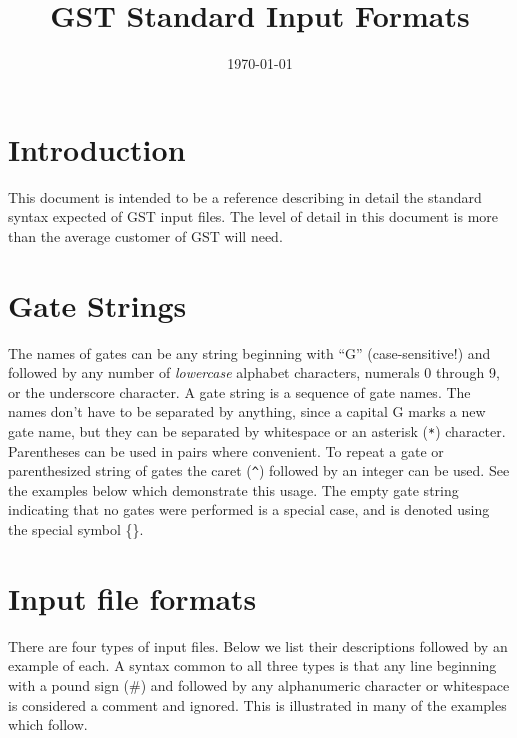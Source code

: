 \documentclass{article}[11pt]
\title{GST Standard Input Formats}
\date{\today}
\begin{document}
\maketitle


\section{Introduction}
This document is intended to be a reference describing in detail the standard syntax expected of GST input files.  The level of detail in this document is more than the average customer of GST will need.

\section{Gate Strings}
The names of gates can be any string beginning with ``G'' (case-sensitive!) and followed by any number of \emph{lowercase} alphabet characters, numerals 0 through 9, or the underscore character. A gate string is a sequence of gate names.  The names don't have to be separated by anything, since a capital G marks a new gate name, but they can be separated by whitespace or an asterisk (\texttt{*}) character.  Parentheses can be used in pairs where convenient.  To repeat a gate or parenthesized string of gates the caret (\texttt{\^{}}) followed by an integer can be used.  See the examples below which demonstrate this usage. The empty gate string indicating that no gates were performed is a special case, and is denoted using the special symbol \{\}.

\section{Input file formats}

There are four types of input files.  Below we list their descriptions followed by an example of each.  A syntax common to all three types is that any line beginning with a pound sign (\#) and followed by any alphanumeric character or whitespace is considered a comment and ignored.  This is illustrated in many of the examples which follow.
\end{document}
